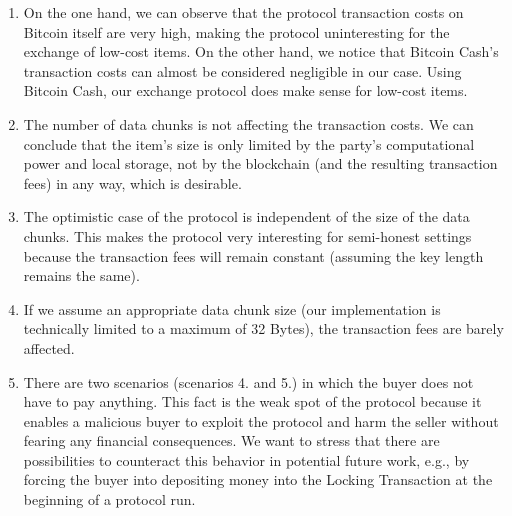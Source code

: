 \documentclass{cacthesis}
\newcounter{protocol}
\begin{document}
        \begin{enumerate}
        
        \item On the one hand, we can observe that the protocol transaction costs on Bitcoin itself are very high, making the protocol uninteresting for the exchange of low-cost items. On the other hand, we notice that Bitcoin Cash's transaction costs can almost be considered negligible in our case. Using Bitcoin Cash, our exchange protocol does make sense for low-cost items.
        
        \item The number of data chunks is not affecting the transaction costs. We can conclude that the item's size is only limited by the party's computational power and local storage, not by the blockchain (and the resulting transaction fees) in any way, which is desirable.
        
        \item The optimistic case of the protocol is independent of the size of the data chunks. This makes the protocol very interesting for semi-honest settings because the transaction fees will remain constant (assuming the key length remains the same).
                    
        \item If we assume an appropriate data chunk size (our implementation is technically limited to a maximum of 32 Bytes), the transaction fees are barely affected. 
        
        \item There are two scenarios (scenarios 4. and 5.) in which the buyer does not have to pay anything. This fact is the weak spot of the protocol because it enables a malicious buyer to exploit the protocol and harm the seller without fearing any financial consequences. We want to stress that there are possibilities to counteract this behavior in potential future work, e.g., by forcing the buyer into depositing money into the Locking Transaction at the beginning of a protocol run.
                    
        \end{enumerate}
	    
	    
	    
\end{document}
